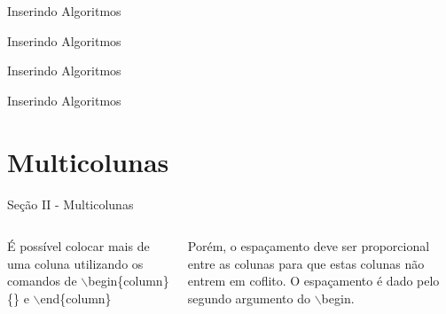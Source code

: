 \documentclass{libs/ufc_format}
\begin{document}

\begin{frame}{Inserindo Algoritmos}
    \lstset{language=Python}
    
\end{frame}

\begin{frame}{Inserindo Algoritmos}
    
\end{frame}

\begin{frame}{Inserindo Algoritmos}
    
\end{frame}

\begin{frame}{Inserindo Algoritmos}
    
\end{frame}

\section{Multicolunas}
\begin{frame}{Seção II - Multicolunas}
    \begin{columns}{}
        \begin{column}{0.5\textwidth}
            \justify
            É possível colocar mais de uma coluna utilizando os comandos de $\backslash$begin\{column\}\{\} e $\backslash$end\{column\} \end{column}
        \begin{column}{0.5\textwidth}
            \justify
            Porém, o espaçamento deve ser proporcional entre as colunas para que estas colunas não entrem em coflito. O espaçamento é dado pelo segundo argumento do $\backslash$begin.
        \end{column}
    \end{columns}    
\end{frame}

\end{document}
